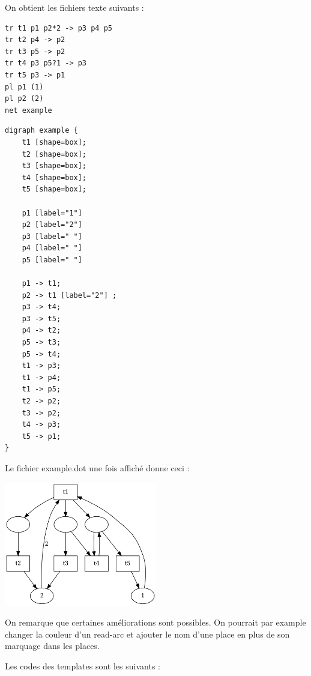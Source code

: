 On obtient les fichiers texte suivants :

\begin{lstlisting}[caption=example.net]
tr t1 p1 p2*2 -> p3 p4 p5
tr t2 p4 -> p2
tr t3 p5 -> p2
tr t4 p3 p5?1 -> p3
tr t5 p3 -> p1
pl p1 (1)
pl p2 (2)
net example
\end{lstlisting}

\begin{lstlisting}[caption=example.dot]
digraph example {
	t1 [shape=box];
	t2 [shape=box];
	t3 [shape=box];
	t4 [shape=box];
	t5 [shape=box];

	p1 [label="1"]
	p2 [label="2"]
	p3 [label=" "]
	p4 [label=" "]
	p5 [label=" "]

	p1 -> t1;
	p2 -> t1 [label="2"] ;
	p3 -> t4;
	p3 -> t5;
	p4 -> t2;
	p5 -> t3;
	p5 -> t4;
	t1 -> p3;
	t1 -> p4;
	t1 -> p5;
	t2 -> p2;
	t3 -> p2;
	t4 -> p3;
	t5 -> p1;
}
\end{lstlisting}

Le fichier example.dot une fois affiché donne ceci :

\begin{center}
\includegraphics[width = 0.5\textwidth]{../Images/tp4/example.png}
\end{center}

On remarque que certaines améliorations sont possibles. On pourrait par example changer la couleur d'un read-arc et ajouter le nom d'une place en plus de son marquage dans les places.

Les codes des templates sont les suivants :

